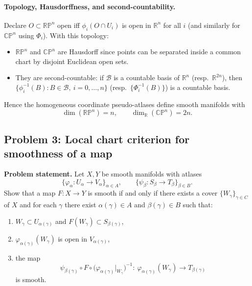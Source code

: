\documentclass[12pt,a4paper]{article}
\theoremstyle{plain}
\theoremstyle{definition}      %
\begin{document}
\paragraph{Topology, Hausdorffness, and second-countability.}
Declare $O\subset\mathbb{RP}^n$ open iff $\phi_i(O\cap U_i)$ is open in $\mathbb R^n$ for all $i$
(and similarly for $\mathbb{CP}^n$ using $\Phi_i$).
With this topology:
\begin{itemize}
	\item $\mathbb{RP}^n$ and $\mathbb{CP}^n$ are Hausdorff since points can be separated inside a common chart by disjoint Euclidean open sets.
	\item They are second-countable: if $\mathcal B$ is a countable basis of $\mathbb R^n$ (resp.\ $\mathbb R^{2n}$), then
	$\{\phi_i^{-1}(B):B\in\mathcal B,\ i=0,\dots,n\}$ (resp.\ $\{\Phi_i^{-1}(B)\}$) is a countable basis.
\end{itemize}
Hence the homogeneous coordinate pseudo-atlases define smooth manifolds with
\[
\dim(\mathbb{RP}^n)=n,
\qquad
\dim_{\mathbb R}(\mathbb{CP}^n)=2n.
\]


\subsection*{Problem 3: Local chart criterion for smoothness of a map}

\noindent\textbf{Problem statement.}
Let $X,Y$ be smooth manifolds with atlases
\[
\{\varphi_\alpha:U_\alpha\to V_\alpha\}_{\alpha\in A},
\qquad
\{\psi_\beta:S_\beta\to T_\beta\}_{\beta\in B}.
\]
Show that a map $F:X\to Y$ is smooth if and only if there exists a cover $\{W_\gamma\}_{\gamma\in C}$ of $X$ and
for each $\gamma$ there exist $\alpha(\gamma)\in A$ and $\beta(\gamma)\in B$ such that:
\begin{enumerate}
	\item[(a)] $W_\gamma\subset U_{\alpha(\gamma)}$ and $F(W_\gamma)\subset S_{\beta(\gamma)}$,
	\item[(b)] $\varphi_{\alpha(\gamma)}(W_\gamma)$ is open in $V_{\alpha(\gamma)}$,
	\item[(c)] the map
	\[
	\psi_{\beta(\gamma)}\circ F\circ \big(\varphi_{\alpha(\gamma)}\vert_{W_\gamma}\big)^{-1}
	:\ \varphi_{\alpha(\gamma)}(W_\gamma)\longrightarrow T_{\beta(\gamma)}
	\]
	is smooth.
\end{enumerate}
\end{document}
